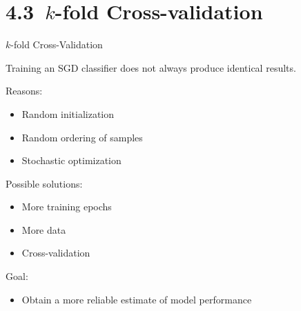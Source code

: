 \documentclass[aspectratio=169]{beamer}
\begin{document}

\section{4.3~$k$-fold Cross-validation}


\begin{frame}{$k$-fold Cross-Validation}
	
	Training an SGD classifier does not always produce identical results.
	
	\vspace{0.5em}
	
	Reasons:
	
	\begin{itemize}
		\item Random initialization
		\item Random ordering of samples
		\item Stochastic optimization
	\end{itemize}
	
	\vspace{0.5em}
	
	Possible solutions:
	
	\begin{itemize}
		\item More training epochs
		\item More data
		\item Cross-validation
	\end{itemize}
	
	\vspace{0.5em}
	
	Goal:
	\begin{itemize}
		\item Obtain a more reliable estimate of model performance
	\end{itemize}
	
\end{frame}

\end{document}
